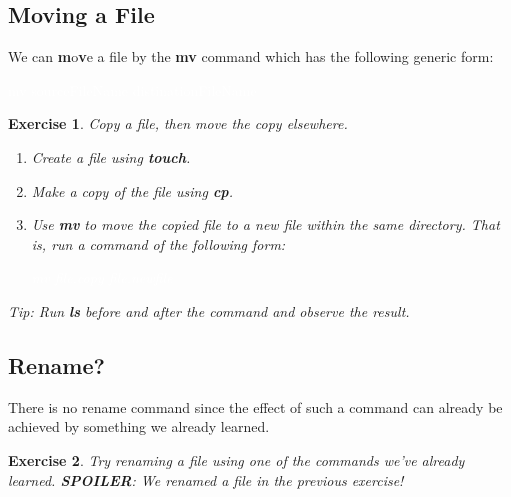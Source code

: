 \documentclass[oneside]{book}
\newcommand{\commandline}[1]{\begin{center} \colorbox{Dark}{\textcolor{white}{#1}} \end{center}}
\newtheorem{ex}{Exercise}[chapter]
\begin{document}
\subsection{Moving a File}
We can \textbf{m}o\textbf{v}e a file by the \textbf{mv} command which has the following generic form:
\commandline{mv sourceFileName distinationFileName}
\vspace{0.3cm}
\begin{ex} Copy a file, then move the copy elsewhere.
    \begin{enumerate}
        \item Create a file using \textbf{touch}.
        \item Make a copy of the file using \textbf{cp}.
        \item Use \textbf{mv} to move the copied file to a new file within the same directory. That is, run a command of the following form:
        \commandline{mv file.copy file.newfile}
    \end{enumerate}
Tip: Run \textbf{ls} before and after the command and observe the result.
\end{ex}

\subsection{Rename?}
There is no rename command since the effect of such a command can already be achieved by something we already learned.
\vspace{0.3cm}

\begin{ex}
	Try renaming a file using one of the commands we've already learned. \textbf{SPOILER}: We renamed a file in the previous exercise!
\end{ex}	
\end{document}
